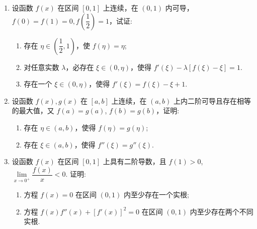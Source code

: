 \newpage

\begin{enumerate}[label=\textbf{\arabic*.}, itemsep=6cm, resume]

    \item 设函数 $f(x)$ 在区间 $[0,1]$ 上连续，在 $(0,1)$ 内可导，$f(0) = f(1) = 0, f\left(\dfrac{1}{2}\right) = 1$，试证:
    \begin{enumerate}[label=(\arabic*)]
        \item 存在 $\eta \in \left(\dfrac{1}{2}, 1\right)$，使 $f(\eta) = \eta$;
        \item 对任意实数 $\lambda$，必存在 $\xi \in (0, \eta)$，使得 $f'(\xi) - \lambda[f(\xi) - \xi] = 1$.
        \item 存在一个 $\xi \in (0, \eta)$，使得 $f'(\xi) = f(\xi) - \xi + 1$.
    \end{enumerate}
    
    \item 设函数 $f(x), g(x)$ 在 $[a,b]$ 上连续，在 $(a,b)$ 上内二阶可导且存在相等的最大值，又 $f(a) = g(a)$, $f(b) = g(b)$，证明:
    \begin{enumerate}[label=(\arabic*)]
        \item 存在 $\eta \in (a,b)$，使得 $f(\eta) = g(\eta)$;
        \item 存在 $\xi \in (a,b)$，使得 $f''(\xi) = g''(\xi)$.
    \end{enumerate}
    
    \item 设函数 $f(x)$ 在区间 $[0,1]$ 上具有二阶导数，且 $f(1) > 0$, $\lim\limits_{x \to 0^+} \dfrac{f(x)}{x} < 0$. 证明:
    \begin{enumerate}[label=(\arabic*)]
        \item 方程 $f(x) = 0$ 在区间 $(0,1)$ 内至少存在一个实根;
        \item 方程 $f(x)f''(x) + [f'(x)]^2 = 0$ 在区间 $(0,1)$ 内至少存在两个不同实根.
    \end{enumerate}
    
 \end{enumerate}

\newpage

